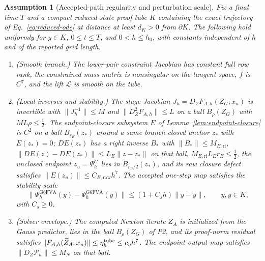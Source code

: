 \documentclass[preprint,12pt]{elsarticle}
\newtheorem{assumption}{Assumption}
\begin{document}
\begin{assumption}[Accepted-path regularity and perturbation scale]
\label{ass:regularity}
Fix a final time $T$ and a compact reduced-state proof tube $K$ containing
the exact trajectory of Eq.~\eqref{eq:reduced-ode} at distance at least
$d_K>0$ from $\partial K$. The following hold uniformly for $y\in K$,
$0\le t\le T$, and $0<h\le h_0$, with constants independent of $h$ and of the
reported grid length.
\begin{enumerate}
  \item[P1.] (Smooth branch.) The lower-pair constraint Jacobian has constant
  full row rank, the constrained mass matrix is nonsingular on the tangent
  space, $f$ is $C^7$, and the lift $\mathcal L$ is smooth on the tube.
  \item[P2.] (Local inverses and stability.) The stage Jacobian
  $J_h=D_ZF_{A,h}(Z_G;x_n)$ is invertible with $\|J_h^{-1}\|\le M$ and
  $\|D_Z^2F_{A,h}\|\le L$ on a ball $B_\rho(Z_G)$ with $ML\rho\le\tfrac12$.
  The endpoint-closure subsystem $E$ of Lemma~\ref{lem:endpoint-closure} is
  $C^2$ on a ball $B_{r_E}(z_\ast)$ around a same-branch closed anchor
  $z_\ast$ with $E(z_\ast)=0$; $DE(z_\ast)$ has a right inverse $B_\ast$ with
  $\|B_\ast\|\le M_{E,\mathrm{ri}}$, $\|DE(z)-DE(z_\ast)\|\le L_E\|z-z_\ast\|$
  on that ball, $M_{E,\mathrm{ri}}L_Er_E\le\tfrac12$, the unclosed endpoint
  $z_u=\Psi_h^G$ lies in $B_{r_E/2}(z_\ast)$, and its raw closure defect
  satisfies $\|E(z_u)\|\le C_{E,\mathrm{raw}}h^7$. The accepted one-step map
  satisfies the stability scale
  \begin{equation}
  \label{eq:assumption-stability-scale}
    \|\Psi_h^{\mathrm{G6FVA}}(y)-\Psi_h^{\mathrm{G6FVA}}(\bar y)\|
    \le (1+C_sh)\|y-\bar y\|,\qquad y,\bar y\in K,
  \end{equation}
  with $C_s\ge0$.
  \item[P6.] (Solver envelope.) The computed Newton iterate
  $\widetilde Z_A$ is initialized from the Gauss predictor, lies in the ball
  $B_\rho(Z_G)$ of P2, and its proof-norm residual satisfies
  $\|F_{A,h}(\widetilde Z_A;x_n)\|\le\eta_h^{\rm tube}\le c_\eta h^7$. The
  endpoint-output map satisfies $\|D_Z\mathcal P_h\|\le M_N$ on that ball.
\end{enumerate}
\end{assumption}
\end{document}
